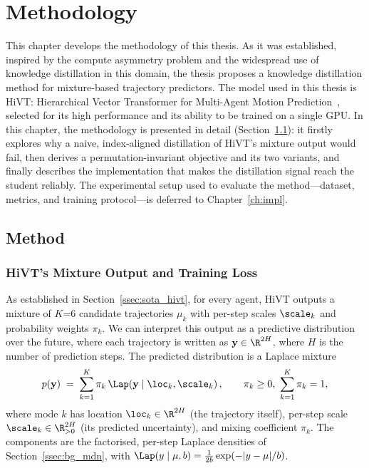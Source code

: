 \chapter{Methodology}
\label{ch:method}

This chapter develops the methodology of this thesis. As
it was established, inspired by the compute asymmetry problem and the widespread
use of knowledge distillation in this domain, the thesis proposes a knowledge distillation
method for mixture-based trajectory predictors. The model used in this thesis
is HiVT: Hierarchical Vector Transformer for Multi-Agent Motion Prediction~\cite{hivt}, 
selected for its high performance and its ability to be trained
on a single GPU. In this chapter, the methodology is presented in detail
(Section~\ref{sec:method}): it firstly explores why a naive, index-aligned
distillation of HiVT's mixture output would fail, then derives a
permutation-invariant objective and its two variants, and finally describes the
implementation that makes the distillation signal reach the student reliably. The
experimental setup used to evaluate the method---dataset, metrics, and training
protocol---is deferred to Chapter~\ref{ch:impl}.

\section{Method}
\label{sec:method}

\subsection{HiVT's Mixture Output and Training Loss}
\label{ssec:method_prelim}
As established in Section~\ref{ssec:sota_hivt}, for every agent, HiVT outputs 
a mixture of $K$=6 candidate trajectories {$\mu_k$} with per-step scales 
{$\scale_k$} and probability weights {$\pi_k$}. 
We can interpret this output as a predictive distribution over the future, where 
each trajectory is written as $\mathbf{y}\in\R^{2H}$, 
where $H$ is the number of prediction steps. The predicted distribution
is a Laplace mixture
\begin{equation}
  \label{eq:mixture}
  p(\mathbf{y}) \;=\; \sum_{k=1}^{K} \pi_k\,
      \Lap\!\left(\mathbf{y}\mid \loc_k, \scale_k\right),
  \qquad \pi_k \ge 0,\ \sum_{k=1}^{K}\pi_k = 1,
\end{equation}
where mode $k$ has location $\loc_k\in\R^{2H}$ (the trajectory itself), per-step
scale $\scale_k\in\R^{2H}_{>0}$ (its predicted uncertainty), and mixing
coefficient $\pi_k$. The components are the factorised, per-step Laplace densities
of Section~\ref{ssec:bg_mdn}, with $\Lap(y\mid\mu,b)=\tfrac{1}{2b}\exp(-|y-\mu|/b)$.

